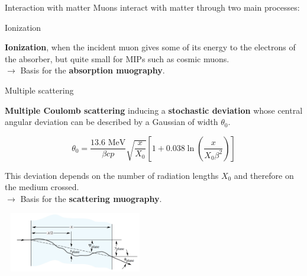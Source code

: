 \documentclass[8 pt]{beamer}
\begin{document}
\begin{frame}{Interaction with matter}
\justifying
Muons interact with matter through two main processes:
\begin{exampleblock}{} Ionization \end{exampleblock}
\textbf{Ionization}, when  the  incident  muon gives some of its energy to the electrons of the absorber, but quite small for MIPs such as cosmic muons. \\
\hspace{10pt} $\rightarrow$ Basis for the \textbf{\alert{absorption muography}}. \vfill

\begin{exampleblock}{} Multiple scattering \end{exampleblock}
\textbf{Multiple Coulomb scattering} inducing a \alert{\textbf{stochastic deviation}} whose central angular deviation can be described by a Gaussian of width $\theta_0$.

\begin{minipage}[c]{.48\textwidth}
\begin{equation*}
\label{eq:Moliere}
\theta_0 = \frac{13.6 \text{ MeV}}{\beta c p} \sqrt{\frac{x}{X_0}} \left [1 + 0.038 \ln \left (\frac{x}{X_0 \beta^2} \right ) \right ]
\end{equation*}

\justifying
This deviation depends on the number of radiation lengths $X_0$ and therefore on the medium crossed. \\
\hspace{10pt} $\rightarrow$ Basis for the \textbf{\alert{scattering muography}}.
\end{minipage} \hfill
\begin{minipage}[c]{.51\textwidth}
	\includegraphics[width=6.3cm, height=2.6cm]{figs/moliere.png}
\end{minipage} \hfill \vfill
\end{frame}
\end{document}

